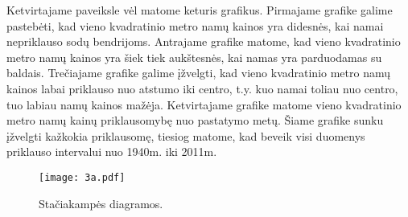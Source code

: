 \documentclass[a4paper]{article}
\begin{document}
\hspace*{0,52cm}Ketvirtajame paveiksle vėl matome keturis grafikus. Pirmajame grafike galime pastebėti, kad vieno kvadratinio metro namų kainos yra didesnės, kai namai nepriklauso sodų bendrijoms. Antrajame grafike matome, kad vieno kvadratinio metro namų kainos yra šiek tiek aukštesnės, kai namas yra parduodamas su baldais. Trečiajame grafike galime įžvelgti, kad vieno kvadratinio metro namų kainos labai priklauso nuo atstumo iki centro, t.y. kuo namai toliau nuo centro, tuo labiau namų kainos mažėja. Ketvirtajame grafike matome vieno kvadratinio metro namų kainų priklausomybę nuo pastatymo metų. Šiame grafike sunku įžvelgti kažkokia priklausomę, tiesiog matome, kad beveik visi duomenys priklauso intervalui nuo 1940m. iki 2011m.
\begin{figure}[H]
  \caption{Stačiakampės diagramos.}
  \centering
    \texttt{[image: 3a.pdf]}
\end{figure}
\end{document}
